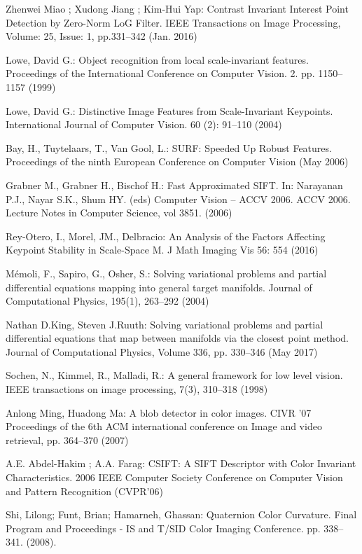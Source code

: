 \documentclass[twocolumn]{svjour3}          %
\begin{document}
\begin{thebibliography}{16}
Zhenwei Miao ; Xudong Jiang ; Kim-Hui Yap:
Contrast Invariant Interest Point Detection by Zero-Norm LoG Filter.
IEEE Transactions on Image Processing, Volume: 25, Issue: 1, pp.331--342 (Jan. 2016)

Lowe, David G.:
Object recognition from local scale-invariant features. 
Proceedings of the International Conference on Computer Vision. 2. pp. 1150--1157 (1999)

Lowe, David G.:
Distinctive Image Features from Scale-Invariant Keypoints.
International Journal of Computer Vision. 60 (2): 91--110 (2004)

Bay, H., Tuytelaars, T., Van Gool, L.:
SURF: Speeded Up Robust Features.
Proceedings of the ninth European Conference on Computer Vision (May 2006)

Grabner M., Grabner H., Bischof H.:
Fast Approximated SIFT. 
In: Narayanan P.J., Nayar S.K., Shum HY. (eds) Computer Vision -- ACCV 2006. ACCV 2006. Lecture Notes in Computer Science, vol 3851. (2006) 

Rey-Otero, I., Morel, JM., Delbracio:
An Analysis of the Factors Affecting Keypoint Stability in Scale-Space
M. J Math Imaging Vis 56: 554 (2016) 


Mémoli, F., Sapiro, G., Osher, S.:
Solving variational problems and partial differential equations mapping into general target manifolds. 
Journal of Computational Physics, 195(1), 263--292 (2004)

Nathan D.King, Steven J.Ruuth:
Solving variational problems and partial differential equations that map between manifolds via the closest point method.
Journal of Computational Physics, Volume 336, pp. 330--346 (May 2017)


Sochen, N., Kimmel, R., Malladi, R.: 
A general framework for low level vision. 
IEEE transactions on image processing, 7(3), 310--318 (1998)

Anlong Ming, Huadong Ma:
A blob detector in color images.
CIVR '07 Proceedings of the 6th ACM international conference on Image and video retrieval, pp. 364--370 (2007)

A.E. Abdel-Hakim ; A.A. Farag:
CSIFT: A SIFT Descriptor with Color Invariant Characteristics.
2006 IEEE Computer Society Conference on Computer Vision and Pattern Recognition (CVPR'06)

Shi, Lilong; Funt, Brian; Hamarneh, Ghassan: 
Quaternion Color Curvature. 
Final Program and Proceedings - IS and T/SID Color Imaging Conference. pp. 338--341. (2008).


\end{thebibliography}
\end{document}
